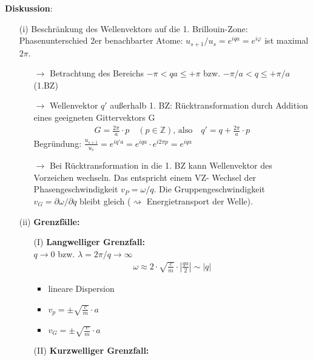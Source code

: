 \begin{itemize}
\begin{figure}[H]
		\caption{}
		\label{fig:4_2disrel}
	\end{figure}
	\textbf{Diskussion}: \\
	\begin{itemize}
		\item[(i)] Beschränkung des Wellenvektors auf die 1. Brillouin-Zone: \\
			Phasenunterschied 2er benachbarter Atome: $u_{s+1} / u_{s} = e^{iqa} = e^{i\varphi}$ ist maximal $2\pi$. 
			\begin{itemize}
				\item[$\rightarrow$] Betrachtung des Bereichs $-\pi < qa \le + \pi$  bzw.  $-\pi/a < q \le +\pi/a $ (1.BZ)
				\item[$\rightarrow$] Wellenvektor $q'$ außerhalb 1. BZ: Rücktransformation durch Addition eines geeigneten Gittervektors G
				\begin{align*}
					G = \frac{2 \pi}{a} \cdot p \quad (p \in \mathbb{Z})\text{, also} \quad q' = q + \frac{2 \pi}{a} \cdot p
				\end{align*}
				Begründung: $\frac{u_{s+1}}{u_{s}} = e^{iq'a} = e^{iqa}\cdot e^{i2\pi p} = e^{iqa}$
				\item[$\rightarrow$] Bei Rücktransformation in die 1. BZ kann Wellenvektor des Vorzeichen wechseln. Das entspricht einem VZ- Wechsel der Phasengeschwindigkeit $v_P = \omega / q$. Die Gruppengeschwindigkeit $v_G = \partial\omega / \partial q$ bleibt gleich ($\rightsquigarrow$ Energietransport der Welle).
			\end{itemize}
		\item[(ii)] \textbf{Grenzfälle:} \\
			\begin{itemize}
				\item[(I)] \textbf{Langwelliger Grenzfall:}\\
				$q \rightarrow 0$ bzw. $\lambda = 2 \pi / q \rightarrow \infty$
				\begin{align*}
					\omega \approx 2 \cdot \sqrt{\frac{c}{m}} \cdot \left| \frac{qa}{2} \right| \sim \left| q \right| 
				\end{align*}
				\begin{itemize}
					\item lineare Dispersion
					\item $v_p = \pm \sqrt{\frac{c}{m}}\cdot a $
					\item $v_G = \pm \sqrt{\frac{c}{m}} \cdot a $
				\end{itemize}
				\item[(II)] \textbf{Kurzwelliger Grenzfall:}\\

\end{itemize}
\end{itemize}
\end{itemize}
